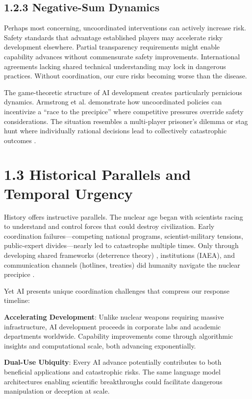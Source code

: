 \documentclass[
  11pt,
  letterpaper,
]{book}
\begin{document}
\subsection{1.2.3 Negative-Sum Dynamics}\label{negative-sum-dynamics}

Perhaps most concerning, uncoordinated interventions can actively
increase risk. Safety standards that advantage established players may
accelerate risky development elsewhere. Partial transparency
requirements might enable capability advances without commensurate
safety improvements. International agreements lacking shared technical
understanding may lock in dangerous practices. Without coordination, our
cure risks becoming worse than the disease.

The game-theoretic structure of AI development creates particularly
pernicious dynamics. Armstrong et al. \textcite{armstrong2016}
demonstrate how uncoordinated policies can incentivize a ``race to the
precipice'' where competitive pressures override safety considerations.
The situation resembles a multi-player prisoner's dilemma or stag hunt
where individually rational decisions lead to collectively catastrophic
outcomes \textcite{samuel2023} \textcite{hunt2025}.

\section{1.3 Historical Parallels and Temporal
Urgency}\label{historical-parallels-and-temporal-urgency}

History offers instructive parallels. The nuclear age began with
scientists racing to understand and control forces that could destroy
civilization. Early coordination failures---competing national programs,
scientist-military tensions, public-expert divides---nearly led to
catastrophe multiple times. Only through developing shared frameworks
(deterrence theory) \textcite{schelling1960}, institutions (IAEA), and
communication channels (hotlines, treaties) did humanity navigate the
nuclear precipice \textcite{rehman2025}.

Yet AI presents unique coordination challenges that compress our
response timeline:

\textbf{Accelerating Development}: Unlike nuclear weapons requiring
massive infrastructure, AI development proceeds in corporate labs and
academic departments worldwide. Capability improvements come through
algorithmic insights and computational scale, both advancing
exponentially.

\textbf{Dual-Use Ubiquity}: Every AI advance potentially contributes to
both beneficial applications and catastrophic risks. The same language
model architectures enabling scientific breakthroughs could facilitate
dangerous manipulation or deception at scale.
\end{document}
